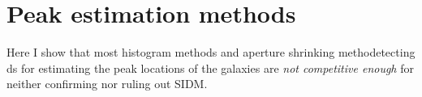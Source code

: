 \label{chapter:3}
\section{Peak estimation methods}
Here I show that most histogram methods and aperture shrinking methodetecting ds for
estimating the peak locations of the galaxies are {\it not competitive enough} for
neither confirming nor ruling out SIDM.
